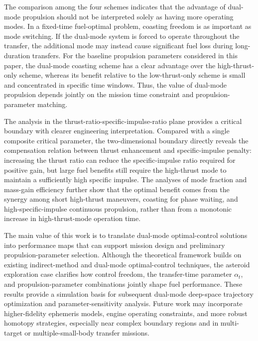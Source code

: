 \documentclass{IEEEtaes}
\begin{document}
The comparison among the four schemes indicates that the advantage of dual-mode propulsion should not be interpreted solely as having more operating modes. In a fixed-time fuel-optimal problem, coasting freedom is as important as mode switching. If the dual-mode system is forced to operate throughout the transfer, the additional mode may instead cause significant fuel loss during long-duration transfers. For the baseline propulsion parameters considered in this paper, the dual-mode coasting scheme has a clear advantage over the high-thrust-only scheme, whereas its benefit relative to the low-thrust-only scheme is small and concentrated in specific time windows. Thus, the value of dual-mode propulsion depends jointly on the mission time constraint and propulsion-parameter matching.

The analysis in the thrust-ratio-specific-impulse-ratio plane provides a critical boundary with clearer engineering interpretation. Compared with a single composite critical parameter, the two-dimensional boundary directly reveals the compensation relation between thrust enhancement and specific-impulse penalty: increasing the thrust ratio can reduce the specific-impulse ratio required for positive gain, but large fuel benefits still require the high-thrust mode to maintain a sufficiently high specific impulse. The analyses of mode fraction and mass-gain efficiency further show that the optimal benefit comes from the synergy among short high-thrust maneuvers, coasting for phase waiting, and high-specific-impulse continuous propulsion, rather than from a monotonic increase in high-thrust-mode operation time.

The main value of this work is to translate dual-mode optimal-control solutions into performance maps that can support mission design and preliminary propulsion-parameter selection. Although the theoretical framework builds on existing indirect-method and dual-mode optimal-control techniques, the asteroid exploration case clarifies how control freedom, the transfer-time parameter $\alpha_t$, and propulsion-parameter combinations jointly shape fuel performance. These results provide a simulation basis for subsequent dual-mode deep-space trajectory optimization and parameter-sensitivity analysis. Future work may incorporate higher-fidelity ephemeris models, engine operating constraints, and more robust homotopy strategies, especially near complex boundary regions and in multi-target or multiple-small-body transfer missions.




\end{document}

